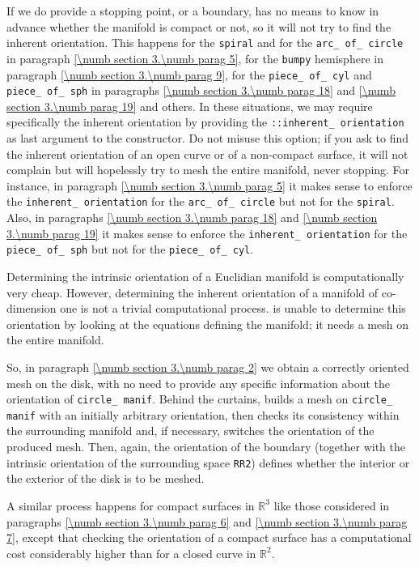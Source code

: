 If we do provide a stopping point, or a boundary, {\maniFEM} has no means to know in
advance whether the manifold
is compact or not, so it will not try to find the inherent orientation.
This happens for the {\small\tt spiral} and for the {\small\tt arc\_\,of\_\,circle} in paragraph
\ref{\numb section 3.\numb parag 5}, for the {\small\tt bumpy} hemisphere in paragraph
\ref{\numb section 3.\numb parag 9}, for the {\small\tt piece\_\,of\_\,cyl} and
{\small\tt piece\_\,of\_\,sph} in paragraphs \ref{\numb section 3.\numb parag 18} and
\ref{\numb section 3.\numb parag 19} and others.
In these situations, we may require specifically the inherent orientation
by providing the {\small\tt {}::inherent\_\,orientation} as last argument to the
{\small\tt {}} constructor.
Do not misuse this option; if you ask {\maniFEM} to find the inherent orientation of an open
curve or of a non-compact surface, it will not complain but will hopelessly try to mesh
the entire manifold, never stopping.
For instance, in paragraph \ref{\numb section 3.\numb parag 5} it makes sense to enforce the
{\small\tt inherent\_\,orientation} for the {\small\tt arc\_\,of\_\,circle} but not for the
{\small\tt spiral}.
Also, in paragraphs \ref{\numb section 3.\numb parag 18} and
\ref{\numb section 3.\numb parag 19} it makes sense to enforce the
{\small\tt inherent\_\,orientation} for the
{\small\tt piece\_\,of\_\,sph} but not for the {\small\tt piece\_\,of\_\,cyl}.

Determining the intrinsic orientation of a Euclidian manifold is computationally
very cheap.
However, determining the inherent orientation of a manifold of co-dimension one is not
a trivial computational process.
{\ManiFEM} is unable to determine this orientation by looking at the equations defining
the manifold; it needs a mesh on the entire manifold.

So, in paragraph \ref{\numb section 3.\numb parag 2} we obtain a correctly oriented mesh
on the disk, with no need to provide any specific information about the orientation of
{\small\tt circle\_\,manif}.
Behind the curtains, {\maniFEM} builds a mesh on {\small\tt circle\_\,manif} with
an initially arbitrary orientation, then checks its consistency
within the surrounding manifold and, if necessary, switches the orientation of the produced mesh.
Then, again, the orientation of the boundary (together with the intrinsic orientation of
the surrounding space {\small\tt RR2}) defines whether the interior or the exterior of the
disk is to be meshed.

A similar process happens for compact surfaces in $ \mathbb{R}^3 $ like those
considered in paragraphs \ref{\numb section 3.\numb parag 6} and
\ref{\numb section 3.\numb parag 7},
except that checking the orientation of a compact surface has a computational cost
considerably higher than for a closed curve in $ \mathbb{R}^2 $.

